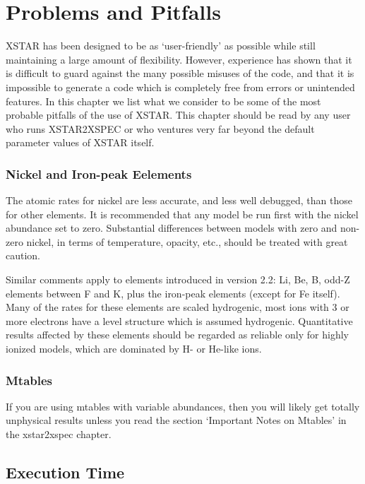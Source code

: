 \chapter{Problems and Pitfalls}
\label{sec:pitfalls}

XSTAR has been designed to be as `user-friendly' as possible while 
still maintaining a large amount of flexibility.  However, experience has 
shown that it is difficult to guard against the many possible misuses of 
the code, and that it is impossible to generate a code which is completely 
free from errors or unintended features.  In this chapter we list
what we consider to be some of the most probable pitfalls 
of the use of XSTAR.  This chapter should be read by any user who runs
XSTAR2XSPEC or who ventures very far beyond the default parameter values 
of XSTAR itself.


\subsection{Nickel and Iron-peak Eelements}

The atomic rates for nickel are less accurate, and less well debugged, than those 
for other elements.  It is recommended that any model be run first with the nickel
abundance set to zero.  Substantial differences between models with zero and non-zero nickel, 
in terms of temperature, opacity, etc., should be treated with great caution.

Similar comments apply to elements introduced in version 2.2:  Li, Be, B, odd-Z elements between 
F and K, plus the iron-peak elements (except for Fe itself).  Many of the rates 
for these elements are scaled hydrogenic, most ions with 3 or more electrons 
have a level structure which is assumed hydrogenic.  Quantitative results affected 
by these elements should be regarded as reliable only for highly ionized models, which 
are dominated by H- or He-like ions.  

\subsection{Mtables}

If you are using mtables with variable abundances, then you will likely get 
totally unphysical results unless you read the section `Important Notes on Mtables'
in the xstar2xspec chapter.

\section{Execution Time}


